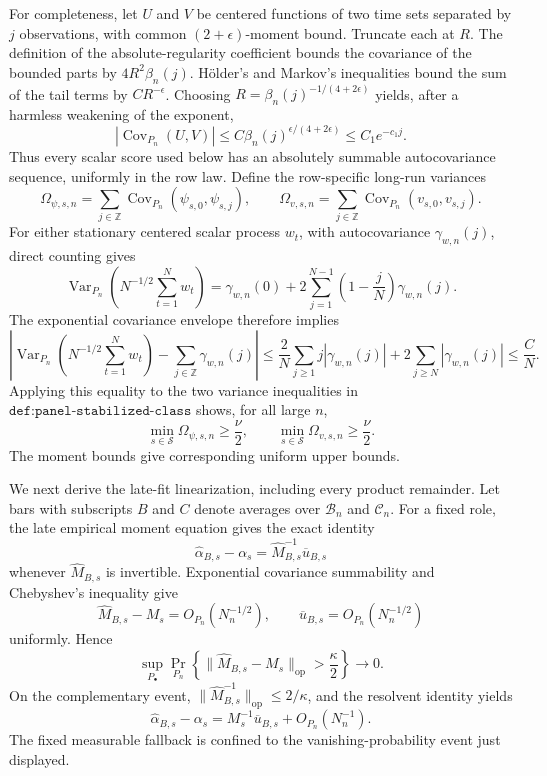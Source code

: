 For completeness, let \(U\) and \(V\) be centered functions of two time sets separated by \(j\) observations, with common \((2+\epsilon)\)-moment bound.  Truncate each at \(R\).  The definition of the absolute-regularity coefficient bounds the covariance of the bounded parts by \(4R^2\beta_n(j)\).  H\"older's and Markov's inequalities bound the sum of the tail terms by \(CR^{-\epsilon}\).  Choosing \(R=\beta_n(j)^{-1/(4+2\epsilon)}\) yields, after a harmless weakening of the exponent,
\[
 |\operatorname{Cov}_{P_n}(U,V)|
 \leq C\beta_n(j)^{\epsilon/(4+2\epsilon)}
 \leq C_1e^{-c_1j}.
\]
Thus every scalar score used below has an absolutely summable autocovariance sequence, uniformly in the row law.  Define the row-specific long-run variances
\[
 \Omega_{\psi,s,n}=\sum_{j\in\mathbb Z}
 \operatorname{Cov}_{P_n}(\psi_{s,0},\psi_{s,j}),
 \qquad
 \Omega_{v,s,n}=\sum_{j\in\mathbb Z}
 \operatorname{Cov}_{P_n}(v_{s,0},v_{s,j}).
\]
For either stationary centered scalar process \(w_t\), with autocovariance \(\gamma_{w,n}(j)\), direct counting gives
\[
 \operatorname{Var}_{P_n}\!\left(N^{-1/2}\sum_{t=1}^Nw_t\right)
 =\gamma_{w,n}(0)+2\sum_{j=1}^{N-1}\left(1-\frac jN\right)\gamma_{w,n}(j).
\]
The exponential covariance envelope therefore implies
\[
 \left|
  \operatorname{Var}_{P_n}\!\left(N^{-1/2}\sum_{t=1}^Nw_t\right)
  -\sum_{j\in\mathbb Z}\gamma_{w,n}(j)
 \right|
 \leq \frac2N\sum_{j\geq1}j|\gamma_{w,n}(j)|
       +2\sum_{j\geq N}|\gamma_{w,n}(j)|
 \leq \frac CN.
\]
Applying this equality to the two variance inequalities in \(\texttt{def:panel-stabilized-class}\) shows, for all large \(n\),
\[
 \min_{s\in\mathcal S}\Omega_{\psi,s,n}\geq\frac\nu2,
 \qquad
 \min_{s\in\mathcal S}\Omega_{v,s,n}\geq\frac\nu2.
\]
The moment bounds give corresponding uniform upper bounds.

We next derive the late-fit linearization, including every product remainder.  Let bars with subscripts \(B\) and \(C\) denote averages over \(\mathcal B_n\) and \(\mathcal C_n\).  For a fixed role, the late empirical moment equation gives the exact identity
\[
 \widehat\alpha_{B,s}-\alpha_s
 =\widehat M_{B,s}^{-1}\overline u_{B,s}
\]
whenever \(\widehat M_{B,s}\) is invertible.  Exponential covariance summability and Chebyshev's inequality give
\[
 \widehat M_{B,s}-M_s=O_{P_n}(N_n^{-1/2}),
 \qquad
 \overline u_{B,s}=O_{P_n}(N_n^{-1/2})
\]
uniformly.  Hence
\[
 \sup_{P_\bullet}\Pr_{P_n}\!\left\{
  \lVert\widehat M_{B,s}-M_s\rVert_{\mathrm{op}}>\frac\kappa2
 \right\}\longrightarrow0.
\]
On the complementary event, \(\lVert\widehat M_{B,s}^{-1}\rVert_{\mathrm{op}}\leq2/\kappa\), and the resolvent identity yields
\[
 \widehat\alpha_{B,s}-\alpha_s
 =M_s^{-1}\overline u_{B,s}+O_{P_n}(N_n^{-1}).
\]
The fixed measurable fallback is confined to the vanishing-probability event just displayed.

